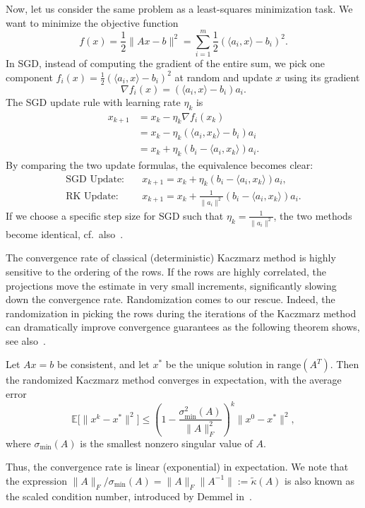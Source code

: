 Now, let us consider the same problem as a least-squares minimization task. We want to minimize the objective function
$$f(x) = \frac{1}{2} \|Ax - b\|^2 = \sum_{i=1}^m \frac{1}{2} (\langle a_i,x\rangle - b_i)^2.$$
In SGD, instead of computing the gradient of the entire sum, we pick one component $f_i(x) = \frac{1}{2} (\langle a_i, x\rangle - b_i)^2$ at random and update $x$ using its gradient
$$\nabla f_i(x) = (\langle a_i, x\rangle - b_i) a_i.$$
The SGD update rule with learning rate $\eta_k$ is
\begin{align*}
x_{k+1} & = x_k - \eta_k \nabla f_i(x_k) \\
        & = x_k - \eta_k (\langle a_i, x_k\rangle - b_i) a_i \\
        & = x_k + \eta_k (b_i - \langle a_i, x_k \rangle) a_i. 
\end{align*}
By comparing the two update formulas, the equivalence becomes clear: 
\begin{align*}
\text{SGD Update:} & \quad x_{k+1} = x_k + \eta_k (b_i - \langle a_i, x_k \rangle) a_i, \\
\text{RK Update:} & \quad x_{k+1} = x_k + \frac{1}{\|a_i\|^2} (b_i - \langle a_i, x_k \rangle) a_i.
\end{align*}
If we choose a specific step size for SGD such that
$\eta_k = \frac{1}{\|a_i\|^2}$,
the two methods become identical, cf.\ also~\cite{needell2014stochastic}.


The convergence rate of classical (deterministic) Kaczmarz method is highly sensitive to the ordering of the rows.
If the rows are highly correlated, the projections move the estimate in very small increments, significantly slowing down the convergence rate. Randomization comes to our rescue. Indeed, the randomization in picking the rows during the iterations of the Kaczmarz method can dramatically improve convergence guarantees as the following theorem shows, see also~\cite{SV06}.

\begin{theorem}
Let $Ax = b$ be consistent, and let $x^*$ be the unique solution in $\mathrm{range}(A^T)$.
Then the randomized Kaczmarz method converges in expectation, with the average error
$$
\mathbb{E}\big[\|x^k - x^*\|^2\big]
\le
\left(1 - \frac{\sigma_{\min}^2(A)}{\|A\|_F^2}\right)^k
\|x^0 - x^*\|^2,
$$
where $\sigma_{\min}(A)$ is the smallest nonzero singular value of $A$.
\end{theorem}

Thus, the convergence rate is linear (exponential) in expectation. We note that the expression $\|A\|_F/\sigma_{\min}(A) = \|A\|_F \|A^{-1}\|:= \tilde{\kappa}(A)$ is also known as the scaled condition number, introduced by Demmel in~\cite{demmel1988probability}.

